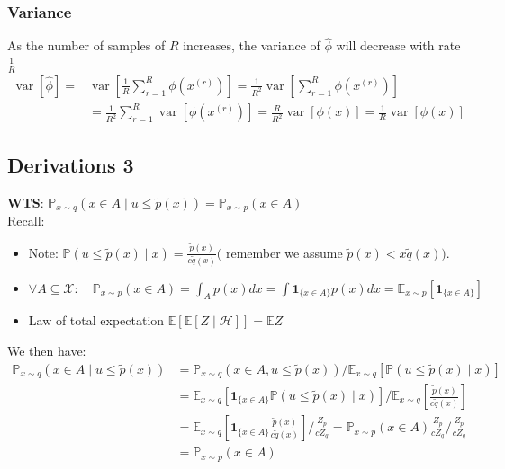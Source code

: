 \subsubsection*{Variance}
As the number of samples of $R$ increases, the variance of $\hat{\phi}$ will decrease with rate $\frac{1}{R}$
$$
\begin{aligned}
\operatorname{var}[\hat{\phi}]= & \operatorname{var}\left[\frac{1}{R} \sum_{r=1}^R \phi\left(x^{(r)}\right)\right]=\frac{1}{R^2} \operatorname{var}\left[\sum_{r=1}^R \phi\left(x^{(r)}\right)\right] \\
& =\frac{1}{R^2} \sum_{r=1}^R \operatorname{var}\left[\phi\left(x^{(r)}\right)\right]=\frac{R}{R^2} \operatorname{var}[\phi(x)]=\frac{1}{R} \operatorname{var}[\phi(x)]
\end{aligned}
$$

\subsection{Derivations 3}
\label{sec:rejection}
\textbf{WTS}: $\mathbb{P}_{x \sim q}(x \in A \mid u \leq \tilde{p}(x))=\mathbb{P}_{x \sim p}(x \in A)$\\
Recall:
\begin{itemize}
    \item Note: $\mathbb{P}(u \leq \tilde{p}(x) \mid x)=\frac{\tilde{p}(x)}{c \tilde{q}(x)}($ remember we assume $\tilde{p}(x)<x \tilde{q}(x))$.
    \item $\forall A \subseteq \mathcal{X}: \quad \mathbb{P}_{x \sim p}(x \in A)=\int_A p(x) d x=\int \mathbf{1}_{\{x \in A\}} p(x) d x=\mathbb{E}_{x \sim p}\left[\mathbf{1}_{\{x \in A\}}\right]$
    \item Law of total expectation $\mathbb{E}[\mathbb{E}[Z \mid \mathcal{H}]]=\mathbb{E} Z$
\end{itemize}
We then have:
$$
\begin{aligned}
\mathbb{P}_{x \sim q}(x \in A \mid u \leq \tilde{p}(x)) & =\mathbb{P}_{x \sim q}(x \in A, u \leq \tilde{p}(x)) / \mathbb{E}_{x \sim q}[\mathbb{P}(u \leq \tilde{p}(x) \mid x)] \\
& =\mathbb{E}_{x \sim q}\left[\mathbf{1}_{\{x \in A\}} \mathbb{P}(u \leq \tilde{p}(x) \mid x)\right] / \mathbb{E}_{x \sim q}\left[\frac{\tilde{p}(x)}{c \tilde{q}(x)}\right] \\
& =\mathbb{E}_{x \sim q}\left[\mathbf{1}_{\{x \in A\}} \frac{\tilde{p}(x)}{c \tilde{q}(x)}\right] / \frac{Z_p}{c Z_q}=\mathbb{P}_{x \sim p}(x \in A) \frac{Z_p}{c Z_q} / \frac{Z_p}{c Z_q} \\
& =\mathbb{P}_{x \sim p}(x \in A)
\end{aligned}
$$

